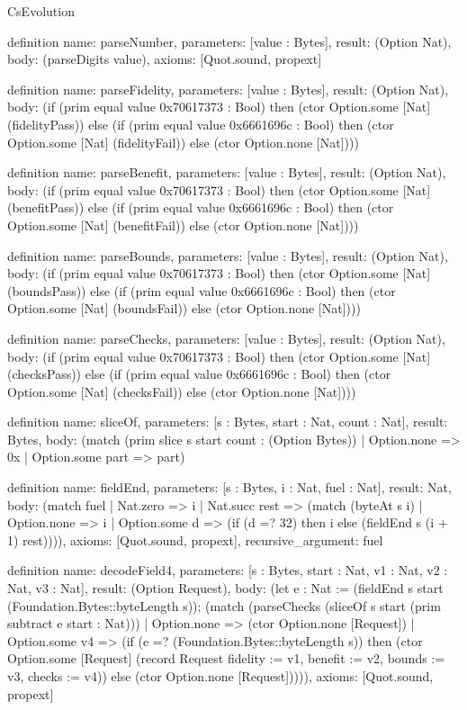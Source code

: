 \begin{lexlean}{CsEvolution}
\begin{semanticmodule}
definition{
  name: parseNumber,
  parameters: [value : Bytes],
  result: (Option Nat),
  body: (parseDigits value),
  axioms: [Quot.sound, propext]
}

definition{
  name: parseFidelity,
  parameters: [value : Bytes],
  result: (Option Nat),
  body: (if (prim equal value 0x70617373 : Bool) then (ctor Option.some [Nat] (fidelityPass)) else (if (prim equal value 0x6661696c : Bool) then (ctor Option.some [Nat] (fidelityFail)) else (ctor Option.none [Nat])))
}

definition{
  name: parseBenefit,
  parameters: [value : Bytes],
  result: (Option Nat),
  body: (if (prim equal value 0x70617373 : Bool) then (ctor Option.some [Nat] (benefitPass)) else (if (prim equal value 0x6661696c : Bool) then (ctor Option.some [Nat] (benefitFail)) else (ctor Option.none [Nat])))
}

definition{
  name: parseBounds,
  parameters: [value : Bytes],
  result: (Option Nat),
  body: (if (prim equal value 0x70617373 : Bool) then (ctor Option.some [Nat] (boundsPass)) else (if (prim equal value 0x6661696c : Bool) then (ctor Option.some [Nat] (boundsFail)) else (ctor Option.none [Nat])))
}

definition{
  name: parseChecks,
  parameters: [value : Bytes],
  result: (Option Nat),
  body: (if (prim equal value 0x70617373 : Bool) then (ctor Option.some [Nat] (checksPass)) else (if (prim equal value 0x6661696c : Bool) then (ctor Option.some [Nat] (checksFail)) else (ctor Option.none [Nat])))
}

definition{
  name: sliceOf,
  parameters: [s : Bytes, start : Nat, count : Nat],
  result: Bytes,
  body: (match (prim slice s start count : (Option Bytes))
    | Option.none => 0x
    | Option.some part => part)
}

definition{
  name: fieldEnd,
  parameters: [s : Bytes, i : Nat, fuel : Nat],
  result: Nat,
  body: (match fuel
    | Nat.zero => i
    | Nat.succ rest => (match (byteAt s i)
      | Option.none => i
      | Option.some d => (if (d =? 32) then i else (fieldEnd s (i + 1) rest)))),
  axioms: [Quot.sound, propext],
  recursive_argument: fuel
}

definition{
  name: decodeField4,
  parameters: [s : Bytes, start : Nat, v1 : Nat, v2 : Nat, v3 : Nat],
  result: (Option Request),
  body: (let e : Nat := (fieldEnd s start (Foundation.Bytes::byteLength s)); (match (parseChecks (sliceOf s start (prim subtract e start : Nat)))
    | Option.none => (ctor Option.none [Request])
    | Option.some v4 => (if (e =? (Foundation.Bytes::byteLength s)) then (ctor Option.some [Request] (record Request {fidelity := v1, benefit := v2, bounds := v3, checks := v4})) else (ctor Option.none [Request])))),
  axioms: [Quot.sound, propext]
}


\end{semanticmodule}
\end{lexlean}
